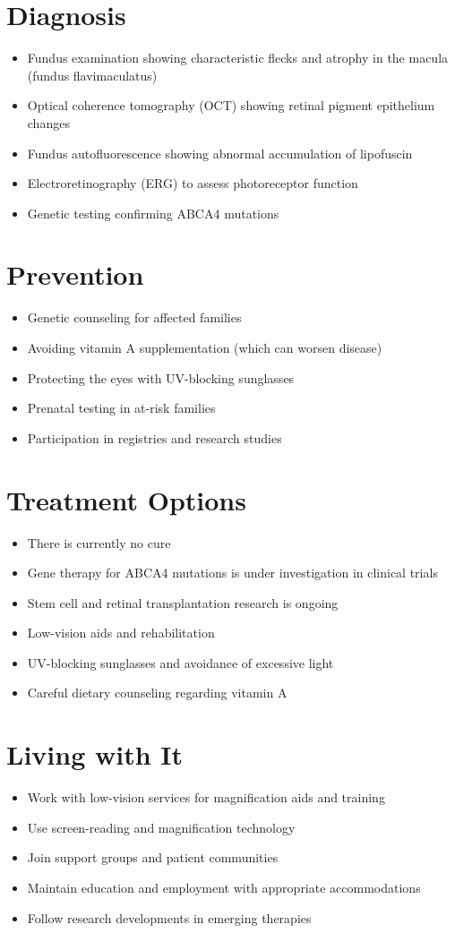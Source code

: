 \section{Diagnosis}
\begin{itemize}[noitemsep]
  \item Fundus examination showing characteristic flecks and atrophy in the macula (fundus flavimaculatus)
  \item Optical coherence tomography (OCT) showing retinal pigment epithelium changes
  \item Fundus autofluorescence showing abnormal accumulation of lipofuscin
  \item Electroretinography (ERG) to assess photoreceptor function
  \item Genetic testing confirming ABCA4 mutations
\end{itemize}
\section{Prevention}
\begin{itemize}[noitemsep]
  \item Genetic counseling for affected families
  \item Avoiding vitamin A supplementation (which can worsen disease)
  \item Protecting the eyes with UV-blocking sunglasses
  \item Prenatal testing in at-risk families
  \item Participation in registries and research studies
\end{itemize}
\section{Treatment Options}
\begin{itemize}[noitemsep]
  \item There is currently no cure
  \item Gene therapy for ABCA4 mutations is under investigation in clinical trials
  \item Stem cell and retinal transplantation research is ongoing
  \item Low-vision aids and rehabilitation
  \item UV-blocking sunglasses and avoidance of excessive light
  \item Careful dietary counseling regarding vitamin A
\end{itemize}
\section{Living with It}
\begin{itemize}[noitemsep]
  \item Work with low-vision services for magnification aids and training
  \item Use screen-reading and magnification technology
  \item Join support groups and patient communities
  \item Maintain education and employment with appropriate accommodations
  \item Follow research developments in emerging therapies
\end{itemize}
